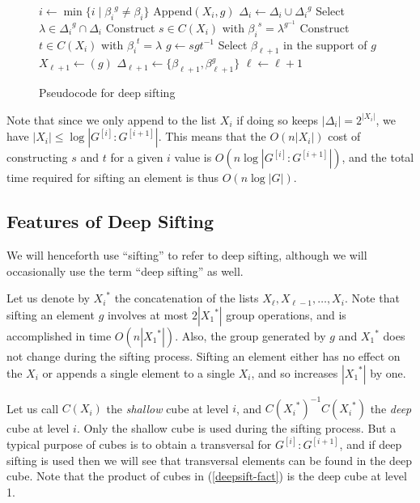 \documentclass[12pt]{article}
\begin{document}
\begin{figure}
\begin{algorithmic}
    \State $i\gets\min\{i \mid {\beta_i}^g\neq\beta_i\}$
      \State  Append$(X_i,g)$
      \State $\Delta_i\gets\Delta_i \cup {\Delta_i}^g$
    \Else
      \State  Select $\lambda\in{\Delta_i}^g \cap \Delta_i$
      \State Construct $s\in C(X_i)$ with ${\beta_i}^s=\lambda^{g^{-1}}$
      \State Construct $t\in C(X_i)$ with ${\beta_i}^t=\lambda$
      \State $g\gets s g t^{-1}$
    \EndIf
  \EndWhile
    \State Select $\beta_{\ell+1}$ in the support of $g$
    \State $X_{\ell+1}\gets (g)$
    \State $\Delta_{\ell+1}\gets\{ \beta_{\ell+1}, \beta_{\ell+1}^g\}$
    \State $\ell\gets\ell+1$
  \EndIf
\EndProcedure
\end{algorithmic}
\caption{Pseudocode for deep sifting}\label{deepsift}
\end{figure}
Note that since we only append to the list $X_i$ if doing so keeps
$|\Delta_i|=2^{|X_i|}$, we have $|X_i|\leq\log|G^{[i]}:G^{[i+1]}|$.  This means
that the $O(n|X_i|)$ cost of constructing $s$ and $t$ for a given $i$ value is
$O(n\log|G^{[i]}:G^{[i+1]}|)$, and
the total time required for sifting an element is thus $O(n\log|G|)$.


\subsection{Features of Deep Sifting}
We will henceforth use ``sifting'' to refer to deep sifting,
although we will occasionally use the term ``deep sifting'' as well.

Let us denote by ${X_i}^*$ the concatenation of
the lists $X_\ell,X_{\ell-1},\ldots,X_i$.
Note that sifting an element $g$ involves at most
$2|{X_1}^*|$ group operations, and is accomplished in time $O(n|{X_1}^*|)$.
Also, the group generated by $g$ and ${X_1}^*$ does not change
during the sifting process.  Sifting an element either
has no effect on the $X_i$ or appends a single element to
a single $X_i$, and so increases $|{X_1}^*|$ by one.

Let us call $C(X_i)$ the {\em shallow}\/ cube at level $i$,
and $C({X_i}^*)^{-1}C({X_i}^*)$
the {\em deep}\/ cube at level $i$.  Only the shallow cube is
used during the sifting process.  But a typical purpose of
cubes
is to obtain a transversal for $G^{[i]}:G^{[i+1]}$, and if deep sifting
is used then we will see that 
transversal elements can be found 
in the deep cube. Note that the
product of cubes in (\ref{deepsift-fact}) is the
deep cube at level 1.
\end{document}
